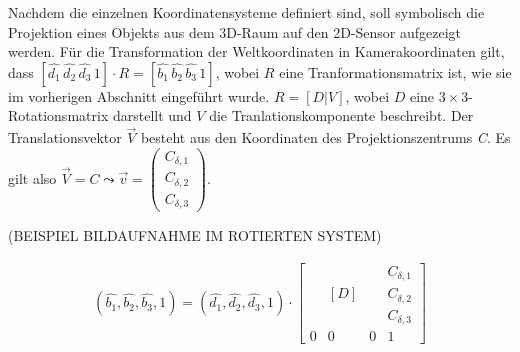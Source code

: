 Nachdem die einzelnen Koordinatensysteme definiert sind, soll symbolisch die Projektion eines Objekts  aus dem 3D-Raum auf den 2D-Sensor aufgezeigt werden. Für die Transformation der Weltkoordinaten in Kamerakoordinaten gilt, dass $[\hat{d_1}\,\hat{d_2}\,\hat{d_3}\,1] \cdot R = [\hat{b_1}\,\hat{b_2}\, \hat{b_3}\, 1]$, wobei $R$ eine Tranformationsmatrix ist, wie sie im vorherigen Abschnitt eingeführt wurde. $R=[D|V]$, wobei $D$ eine $3 \times 3$-Rotationsmatrix darstellt und $V$ die Tranlationskomponente beschreibt. Der Translationsvektor \ensuremath{\vec{V}} besteht aus den Koordinaten des Projektionszentrums \textit{C}. Es gilt also $\vec{V} = C \leadsto \vec{v} = \begin{pmatrix}	C_{\delta,1}\\C_{\delta,2}\\C_{\delta,3}\end{pmatrix}$. 


(BEISPIEL BILDAUFNAHME IM ROTIERTEN SYSTEM)
 
\begin{gather} 		
(\hat{b_1}, \hat{b_2}, \hat{b_3},1)=(\hat{d_1},\hat{d_2},\hat{d_3},1) \cdot
\begin{bmatrix}
&  &  &C_{\delta,1} \\
&  [D]&  &C_{\delta,2} \\ 
&  &  &C_{\delta,3} \\
0&0&0 & 1
\end{bmatrix}	
\end{gather}

